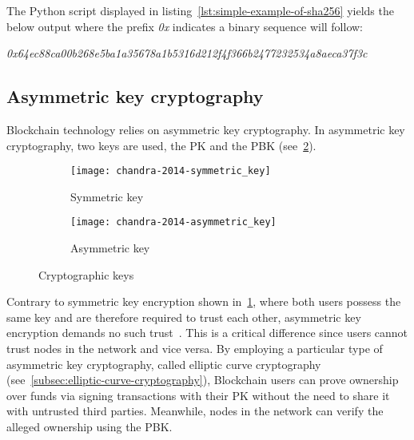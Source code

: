 
The Python script displayed in listing~\ref{lst:simple-example-of-sha256} yields the below output where the prefix \emph{0x} indicates a binary sequence will follow:

\smallskip
\begingroup\small\emph{0x64ec88ca00b268e5ba1a35678a1b5316d212f4f366b2477232534a8aeca37f3c}\endgroup
\smallskip

\subsection{Asymmetric key cryptography}\label{subsec:asymmetric-key-cryptography}

\Gls{Blockchain} technology relies on asymmetric key cryptography.
In asymmetric key cryptography, two keys are used, the \gls{PK} and the \gls{PBK} (see~\cref{fig:asymmetric-key}).

\begin{figure}[H]
    \begin{subfigure}[b]{\textwidth}
        \centering
        \texttt{[image: chandra-2014-symmetric\_key]}
        \caption{Symmetric key}
        \label{fig:symmetric-key}
    \end{subfigure}
    \begin{subfigure}[b]{\textwidth}
        \centering
        \texttt{[image: chandra-2014-asymmetric\_key]}
        \caption{Asymmetric key}
        \label{fig:asymmetric-key}
    \end{subfigure}
    \caption[Cryptographic keys]{Cryptographic keys~\autocite[84]{chandra_comparative_2014}}\label{fig:cryptographic-keys}
\end{figure}

Contrary to symmetric key encryption shown in~\cref{fig:symmetric-key}, where both users possess the same key and are therefore required to trust each other, asymmetric key encryption demands no such trust~\autocites[84]{chandra_comparative_2014}[11]{yaga_blockchain_2018}.
This is a critical difference since users cannot trust nodes in the network and vice versa.
By employing a particular type of asymmetric key cryptography, called elliptic curve cryptography (see~\cref{subsec:elliptic-curve-cryptography}), \gls{Blockchain} users can prove ownership over funds via signing transactions with their \gls{PK} without the need to share it with untrusted third parties.
Meanwhile, nodes in the network can verify the alleged ownership using the \gls{PBK}.


